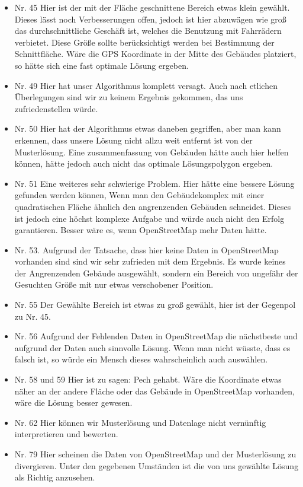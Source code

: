 \begin{itemize}
\item Nr. 45 Hier ist der mit der Fläche geschnittene Bereich etwas klein gewählt.
Dieses lässt noch Verbesserungen offen, jedoch ist hier abzuwägen wie groß das durchschnittliche
Geschäft ist, welches die Benutzung mit Fahrrädern verbietet. Diese Größe sollte berücksichtigt
werden bei Bestimmung der Schnittfläche. Wäre die GPS Koordinate in der Mitte des Gebäudes
platziert, so hätte sich eine fast optimale Lösung ergeben.
\item Nr. 49 Hier hat unser Algorithmus komplett versagt. Auch nach etlichen Überlegungen
sind wir zu keinem Ergebnis gekommen, das uns zufriedenstellen würde.
\item Nr. 50 Hier hat der Algorithmus etwas daneben gegriffen, aber man kann erkennen,
dass unsere Lösung nicht allzu weit entfernt ist von der Musterlösung. Eine zusammenfassung von Gebäuden
hätte auch hier helfen können, hätte jedoch auch nicht das optimale Lösungspolygon ergeben.

\item Nr. 51 Eine weiteres sehr schwierige Problem. Hier hätte eine bessere Lösung gefunden werden können,
Wenn man den Gebäudekomplex mit einer quadratischen Fläche ähnlich den angrenzenden Gebäuden schneidet.
Dieses ist jedoch eine höchst komplexe Aufgabe und würde auch nicht den Erfolg garantieren.
Besser wäre es, wenn OpenStreetMap mehr Daten hätte.

\item Nr. 53. Aufgrund der Tatsache, dass hier keine Daten in OpenStreetMap vorhanden sind
sind wir sehr zufrieden mit dem Ergebnis. Es wurde keines der Angrenzenden Gebäude ausgewählt,
sondern ein Bereich von ungefähr der Gesuchten Größe mit nur etwas verschobener Position.

\item Nr. 55 Der Gewählte Bereich ist etwas zu groß gewählt, hier ist der Gegenpol zu Nr. 45.
\item Nr. 56 Aufgrund der Fehlenden Daten in OpenStreetMap die nächstbeste und aufgrund der Daten
auch sinnvolle Lösung. Wenn man nicht wüsste, dass es falsch ist, so würde ein Mensch dieses wahrscheinlich
auch auswählen.

\item Nr. 58 und 59 Hier ist zu sagen: Pech gehabt. Wäre die Koordinate etwas näher an der andere Fläche
oder das Gebäude in OpenStreetMap vorhanden, wäre die Lösung besser gewesen.
\item Nr. 62 Hier können wir Musterlösung und Datenlage nicht vernünftig interpretieren und bewerten.
\item Nr. 79 Hier scheinen die Daten von OpenStreetMap und der Musterlösung zu divergieren. Unter den
gegebenen Umständen ist die von uns gewählte Lösung als Richtig anzusehen.
\end{itemize}
